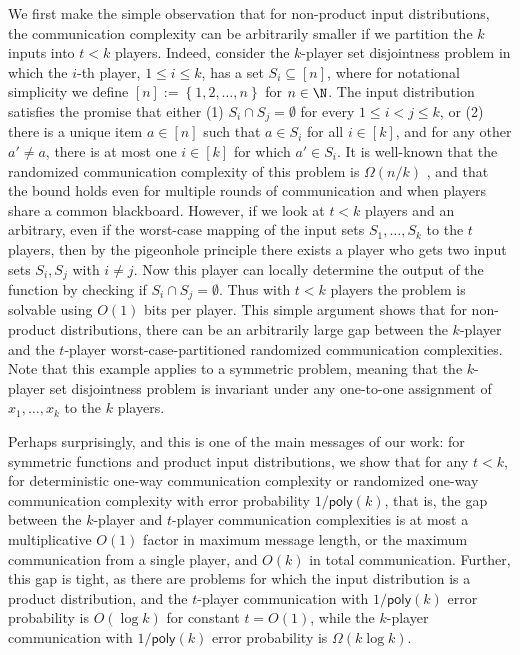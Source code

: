 \documentclass{toc}
\newcommand{\set}[1]{{\left \{{#1} \right \}}}
\newcommand{\poly}{\mathsf{poly}}
\newcommand{\bigo}[1]{\ensuremath{{{O} \left( {#1} \right)}}}
\newcommand{\bigomega}[1]{\ensuremath{{\Omega \left( {#1} \right)}}}
\newcommand{\eqdef}{\ensuremath{:=}}
\begin{document}
We first make the simple observation that for non-product input distributions, the communication complexity can be arbitrarily smaller if we partition the $k$ inputs into $t < k$ players. 
Indeed, consider the $k$-player set disjointness problem in which the $i$-th player, $1 \leq i \leq k$, has a set $S_i \subseteq [n]$, 
where for notational simplicity we define $[n]\eqdef \set{1,2,\dots, n}$ for $n\in \N$. 
The input distribution satisfies the promise that either (1) $S_i \cap S_j = \emptyset$ for every $1\le i < j \le k$, or (2) there is a unique item $a \in [n]$ such that $a \in S_i$ for all $i \in [k]$, and for any other $a' \neq a$, there is at most one $i \in [k]$ for which $a' \in S_i$. It is well-known that the randomized communication complexity of this problem is $\bigomega{n/k}$ \cite{BarYossef:2004eya,g09,jayram2009hellinger}, and that the bound holds even for multiple rounds of communication and when players share a common blackboard. 
However, if we look at $t < k$ players and an arbitrary, even if the worst-case mapping of the input sets $S_1, \ldots, S_k$ to the $t$ players, then by the pigeonhole principle there exists a player who gets two input sets $S_i, S_j$ with $i \ne j$. 
Now this player can locally determine the output of the function by checking if $S_i \cap S_j=\emptyset$. 
Thus with $t < k$ players the problem is solvable using $\bigo{1}$ bits per player. This simple argument shows that for non-product distributions, there can be an arbitrarily large gap between the $k$-player and the $t$-player worst-case-partitioned randomized communication complexities. 
Note that this example applies to a symmetric problem, meaning that the $k$-player set disjointness problem is invariant under any one-to-one assignment of $x_1, \ldots, x_k$ to the $k$ players.

Perhaps surprisingly, and this is one of the main messages of our work: for symmetric functions and product input distributions, we show that for any $t < k$, for deterministic one-way communication complexity or randomized one-way communication complexity with error probability $1/\poly(k)$, that is, the gap between the $k$-player and $t$-player communication complexities is at most a multiplicative $\bigo{1}$ factor in maximum message length, or the maximum communication from a single player, and $O(k)$ in total communication. Further, this gap is tight, as there are problems for which the input distribution is a product distribution, and the $t$-player communication with $1/\poly(k)$ error probability is $\bigo{\log k}$ for constant $t=\bigo{1}$, while the $k$-player communication with $1/\poly(k)$ error probability is $\bigomega{k \log k}$. 
\end{document}
